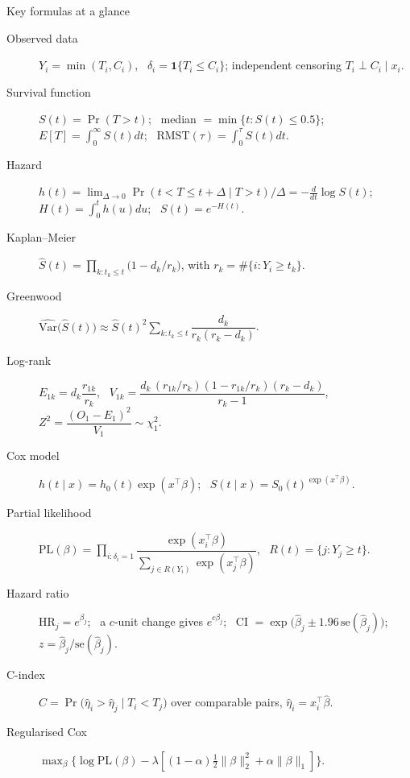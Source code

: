 \documentclass[aspectratio=169,11pt]{beamer}
\begin{document}
\begin{frame}{Key formulas at a glance}
  \scriptsize
  \begin{description}
    \item[Observed data] $Y_i=\min(T_i,C_i)$, \ $\delta_i=\mathbf{1}\{T_i\le C_i\}$;
      independent censoring $T_i\perp C_i\mid x_i$.
    \item[Survival function] $S(t)=\Pr(T>t)$; \ median $=\min\{t:S(t)\le 0.5\}$;
      $E[T]=\int_0^\infty S(t)dt$; \ $\mathrm{RMST}(\tau)=\int_0^\tau S(t)dt$.
    \item[Hazard] $h(t)=\lim_{\Delta\to0}\Pr(t<T\le t+\Delta\mid T>t)/\Delta
      =-\frac{d}{dt}\log S(t)$; \ $H(t)=\int_0^t h(u)du$; \ $S(t)=e^{-H(t)}$.
    \item[Kaplan--Meier] $\hat S(t)=\prod_{k:t_k\le t}\bigl(1-d_k/r_k\bigr)$,
      with $r_k=\#\{i:Y_i\ge t_k\}$.
    \item[Greenwood] $\widehat{\mathrm{Var}}\bigl(\hat S(t)\bigr)\approx
      \hat S(t)^2\sum_{k:t_k\le t}\dfrac{d_k}{r_k(r_k-d_k)}$.
    \item[Log-rank] $E_{1k}=d_k\dfrac{r_{1k}}{r_k}$, \
      $V_{1k}=\dfrac{d_k\,(r_{1k}/r_k)(1-r_{1k}/r_k)(r_k-d_k)}{r_k-1}$, \
      $Z^2=\dfrac{(O_1-E_1)^2}{V_1}\sim\chi^2_1$.
    \item[Cox model] $h(t\mid x)=h_0(t)\exp(x^\top\beta)$; \
      $S(t\mid x)=S_0(t)^{\exp(x^\top\beta)}$.
    \item[Partial likelihood] $\mathrm{PL}(\beta)=\prod_{i:\delta_i=1}
      \dfrac{\exp(x_i^\top\beta)}{\sum_{j\in R(Y_i)}\exp(x_j^\top\beta)}$, \
      $R(t)=\{j:Y_j\ge t\}$.
    \item[Hazard ratio] $\mathrm{HR}_j=e^{\beta_j}$; \ a $c$-unit change gives
      $e^{c\beta_j}$; \ CI $=\exp\bigl(\hat\beta_j\pm1.96\,\mathrm{se}(\hat\beta_j)\bigr)$;
      \ $z=\hat\beta_j/\mathrm{se}(\hat\beta_j)$.
    \item[C-index] $C=\Pr\bigl(\hat\eta_i>\hat\eta_j\mid T_i<T_j\bigr)$ over comparable
      pairs, $\hat\eta_i=x_i^\top\hat\beta$.
    \item[Regularised Cox] $\max_\beta\bigl\{\log\mathrm{PL}(\beta)
      -\lambda[(1-\alpha)\tfrac12\|\beta\|_2^2+\alpha\|\beta\|_1]\bigr\}$.
  \end{description}
\end{frame}
\end{document}
